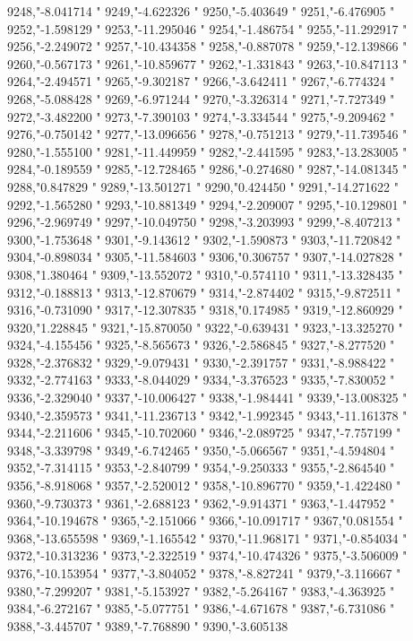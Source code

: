 9248,"-8.041714
"
9249,"-4.622326
"
9250,"-5.403649
"
9251,"-6.476905
"
9252,"-1.598129
"
9253,"-11.295046
"
9254,"-1.486754
"
9255,"-11.292917
"
9256,"-2.249072
"
9257,"-10.434358
"
9258,"-0.887078
"
9259,"-12.139866
"
9260,"-0.567173
"
9261,"-10.859677
"
9262,"-1.331843
"
9263,"-10.847113
"
9264,"-2.494571
"
9265,"-9.302187
"
9266,"-3.642411
"
9267,"-6.774324
"
9268,"-5.088428
"
9269,"-6.971244
"
9270,"-3.326314
"
9271,"-7.727349
"
9272,"-3.482200
"
9273,"-7.390103
"
9274,"-3.334544
"
9275,"-9.209462
"
9276,"-0.750142
"
9277,"-13.096656
"
9278,"-0.751213
"
9279,"-11.739546
"
9280,"-1.555100
"
9281,"-11.449959
"
9282,"-2.441595
"
9283,"-13.283005
"
9284,"-0.189559
"
9285,"-12.728465
"
9286,"-0.274680
"
9287,"-14.081345
"
9288,"0.847829
"
9289,"-13.501271
"
9290,"0.424450
"
9291,"-14.271622
"
9292,"-1.565280
"
9293,"-10.881349
"
9294,"-2.209007
"
9295,"-10.129801
"
9296,"-2.969749
"
9297,"-10.049750
"
9298,"-3.203993
"
9299,"-8.407213
"
9300,"-1.753648
"
9301,"-9.143612
"
9302,"-1.590873
"
9303,"-11.720842
"
9304,"-0.898034
"
9305,"-11.584603
"
9306,"0.306757
"
9307,"-14.027828
"
9308,"1.380464
"
9309,"-13.552072
"
9310,"-0.574110
"
9311,"-13.328435
"
9312,"-0.188813
"
9313,"-12.870679
"
9314,"-2.874402
"
9315,"-9.872511
"
9316,"-0.731090
"
9317,"-12.307835
"
9318,"0.174985
"
9319,"-12.860929
"
9320,"1.228845
"
9321,"-15.870050
"
9322,"-0.639431
"
9323,"-13.325270
"
9324,"-4.155456
"
9325,"-8.565673
"
9326,"-2.586845
"
9327,"-8.277520
"
9328,"-2.376832
"
9329,"-9.079431
"
9330,"-2.391757
"
9331,"-8.988422
"
9332,"-2.774163
"
9333,"-8.044029
"
9334,"-3.376523
"
9335,"-7.830052
"
9336,"-2.329040
"
9337,"-10.006427
"
9338,"-1.984441
"
9339,"-13.008325
"
9340,"-2.359573
"
9341,"-11.236713
"
9342,"-1.992345
"
9343,"-11.161378
"
9344,"-2.211606
"
9345,"-10.702060
"
9346,"-2.089725
"
9347,"-7.757199
"
9348,"-3.339798
"
9349,"-6.742465
"
9350,"-5.066567
"
9351,"-4.594804
"
9352,"-7.314115
"
9353,"-2.840799
"
9354,"-9.250333
"
9355,"-2.864540
"
9356,"-8.918068
"
9357,"-2.520012
"
9358,"-10.896770
"
9359,"-1.422480
"
9360,"-9.730373
"
9361,"-2.688123
"
9362,"-9.914371
"
9363,"-1.447952
"
9364,"-10.194678
"
9365,"-2.151066
"
9366,"-10.091717
"
9367,"0.081554
"
9368,"-13.655598
"
9369,"-1.165542
"
9370,"-11.968171
"
9371,"-0.854034
"
9372,"-10.313236
"
9373,"-2.322519
"
9374,"-10.474326
"
9375,"-3.506009
"
9376,"-10.153954
"
9377,"-3.804052
"
9378,"-8.827241
"
9379,"-3.116667
"
9380,"-7.299207
"
9381,"-5.153927
"
9382,"-5.264167
"
9383,"-4.363925
"
9384,"-6.272167
"
9385,"-5.077751
"
9386,"-4.671678
"
9387,"-6.731086
"
9388,"-3.445707
"
9389,"-7.768890
"
9390,"-3.605138
